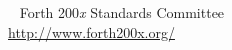 \documentclass[10pt]{book}
\makeatletter
\def\includefile{}
\let\forth@include=
\renewcommand{}[1]{%
	\immediate\write\@auxout{\string\@writefile{toc}{\string\contentsfile{#1}}}%
	\gdef\includefile{#1}%
	\forth@include{#1}%
}
\newcommand{\contentsfile}[1]{}
\newcounter{savepage}
\makeatother
\begin{document}
		\setcounter{page}{\value{savepage}}
	\fi
\fi




\appendix















\pagestyle{empty}
~
\vfill
Forth 200\emph{x} Standards Committee \\[2ex]
\url{http://www.forth200x.org/}
\end{document}
